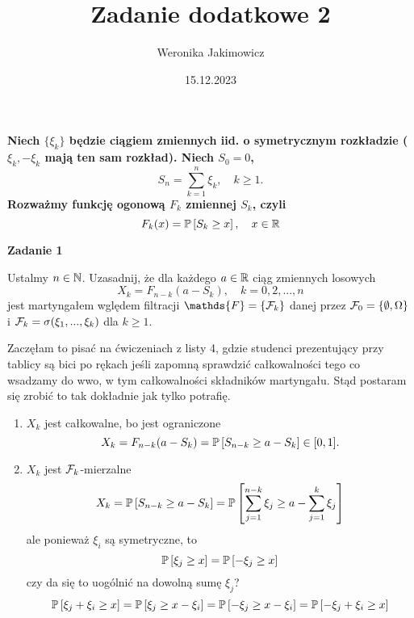 \documentclass{article}
\title{Zadanie dodatkowe 2}
\author{Weronika Jakimowicz}
\date{15.12.2023}
\newenvironment{zadanko}[1]{
  \bfseries{\large\color{orange}Zadanie #1}
}%
{}
\begin{document}
\maketitle
\thispagestyle{empty}

{\bfseries
Niech $\{\xi_k\}$ będzie ciągiem zmiennych iid. o symetrycznym rozkładzie ($\xi_k,-\xi_k$ mają ten sam rozkład). Niech $S_0=0$,
$$S_n=\sum_{k=1}^n\xi_k,\quad k\geq 1.$$
Rozważmy funkcję ogonową $F_k$ zmiennej $S_k$, czyli
$$F_k(x)=\prob{S_k\geq x},\quad x\in\R$$
}

\begin{zadanko}{1}
  Ustalmy $n\in\operatorname{\mathbb{N}}$. Uzasadnij, że dla każdego $a\in\operatorname{\mathbb{R}}$ ciąg zmiennych losowych 
  $$X_k=F_{n-k}(a-S_k),\quad k=0,2,...,n$$
  jest martyngałem wględem filtracji $\mathds{F}=\{\set{F}_k\}$ danej przez $\mathcal{F}_0=\{\emptyset,\Omega\}$ i $\mathcal{F}_k=\sigma(\xi_1,...,\xi_k)$ dla $k\geq 1$.
\end{zadanko}

Zaczęłam to pisać na ćwiczeniach z listy 4, gdzie studenci prezentujący przy tablicy są bici po rękach jeśli zapomną sprawdzić całkowalności tego co wsadzamy do wwo, w tym całkowalności składników martyngału. Stąd postaram się zrobić to tak dokładnie jak tylko potrafię.

\begin{enumerate}
  \item $X_k$ jest całkowalne, bo jest ograniczone
    $$X_k=F_{n-k}(a-S_k)=\prob{S_{n-k}\geq a-S_k}\in[0,1].$$
  \item $X_k$ jest $\mathcal{F}_k$-mierzalne
    $$X_k=\prob{S_{n-k}\geq a-S_k}=\prob{\sum_{j=1}^{n-k}\xi_j\geq a-\sum_{j=1}^k\xi_j}$$
    ale ponieważ $\xi_i$ są symetryczne, to
    $$\prob{\xi_j\geq x}=\prob{-\xi_j\geq x}$$
    czy da się to uogólnić na dowolną sumę $\xi_j$?
    $$\prob{\xi_j+\xi_i\geq x}=\prob{\xi_j\geq x-\xi_i}=\prob{-\xi_j\geq x-\xi_i}=\prob{-\xi_j+\xi_i\geq x}$$
\end{enumerate}
\end{document}
